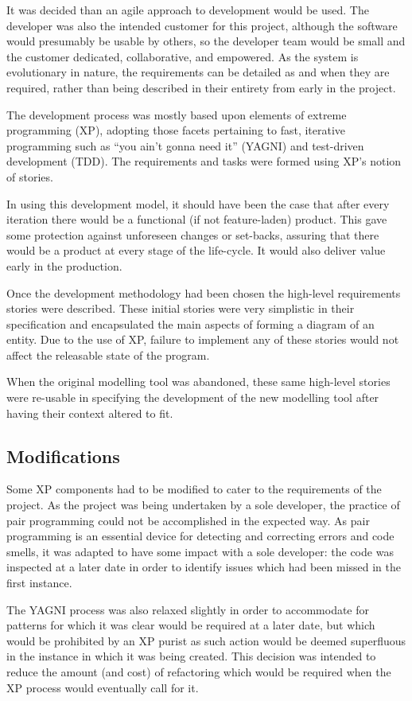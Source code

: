 It was decided than an agile approach to development would be used. The developer was also the intended customer for this project, although the software would presumably be usable by others, so the developer team would be small and the customer dedicated, collaborative, and empowered. As the system is evolutionary in nature, the requirements can be detailed as and when they are required, rather than being described in their entirety from early in the project.

The development process was mostly based upon elements of extreme programming (XP), adopting those facets pertaining to fast, iterative programming such as ``you ain't gonna need it'' (YAGNI) and test-driven development (TDD). The requirements and tasks were formed using XP's notion of stories.

In using this development model, it should have been the case that after every iteration there would be a functional (if not feature-laden) product. This gave some protection against unforeseen changes or set-backs, assuring that there would be a product at every stage of the life-cycle. It would also deliver value early in the production.

Once the development methodology had been chosen the high-level requirements stories were described. These initial stories were very simplistic in their specification and encapsulated the main aspects of forming a diagram of an entity. Due to the use of XP, failure to implement any of these stories would not affect the releasable state of the program.

When the original modelling tool was abandoned, these same high-level stories were re-usable in specifying the development of the new modelling tool after having their context altered to fit.

\subsection{Modifications}
Some XP components had to be modified to cater to the requirements of the project. As the project was being undertaken by a sole developer, the practice of pair programming could not be accomplished in the expected way. As pair programming is an essential device for detecting and correcting errors and code smells, it was adapted to have some impact with a sole developer: the code was inspected at a later date in order to identify issues which had been missed in the first instance.

The YAGNI process was also relaxed slightly in order to accommodate for patterns for which it was clear would be required at a later date, but which would be prohibited by an XP purist as such action would be deemed superfluous in the instance in which it was being created. This decision was intended to reduce the amount (and cost) of refactoring which would be required when the XP process would eventually call for it.

